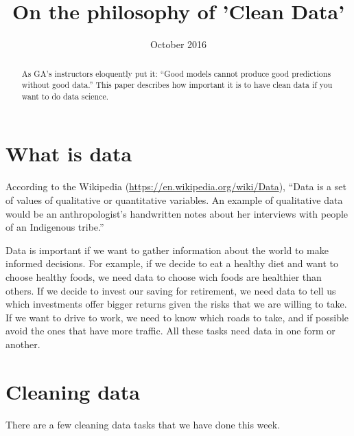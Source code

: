 \documentclass[10pt,a4paper]{article}
\begin{document}
\title{On the philosophy of 'Clean Data'}
\author{October 2016}
\date{}
\maketitle
\setlength{\parindent}{0cm}

\begin{abstract}
  As GA's instructors eloquently put it: ``Good models cannot produce
  good predictions without good data.'' This paper describes how
  important it is to have clean data if you want to do data science.
\end{abstract}

\section{What is data}

According to the Wikipedia (\url{https://en.wikipedia.org/wiki/Data}),
``Data is a set of values of qualitative or quantitative variables. An
example of qualitative data would be an anthropologist's handwritten
notes about her interviews with people of an Indigenous tribe.''
 
Data is important if we want to gather information about the world to
make informed decisions.  For example, if we decide to eat a healthy
diet and want to choose healthy foods, we need data to choose wich
foods are healthier than others.  If we decide to invest our saving
for retirement, we need data to tell us which investments offer bigger
returns given the risks that we are willing to take.  If we want to
drive to work, we need to know which roads to take, and if possible
avoid the ones that have more traffic.  All these tasks need data in
one form or another.

\section{Cleaning data}

There are a few cleaning data tasks that we have done this week.
\end{document}
